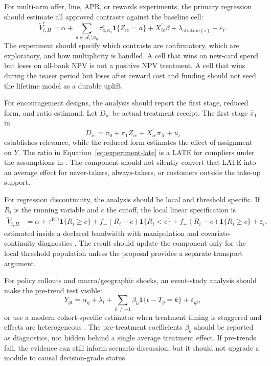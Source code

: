 \documentclass[11pt]{article}
\newcommand{\1}{\mathbf{1}}
\begin{document}
For multi-arm offer, line, APR, or rewards experiments, the primary regression
should estimate all approved contrasts against the baseline cell:
\begin{equation}
  \widetilde{V}^{e}_{i,H}
  =
  \alpha
  +\sum_{a\in\mathcal{A}_e\setminus a_0}
    \tau^{e}_{a,a_0}\1\{Z_{ie}=a\}
  +X_{ie}^{\prime}\beta
  +\lambda_{\mathrm{stratum}(i)}
  +\varepsilon_i.
  \label{eq:multiarm-offer-estimator}
\end{equation}
The experiment should specify which contrasts are confirmatory, which are
exploratory, and how multiplicity is handled. A cell that wins on new-card
spend but loses on all-bank NPV is not a positive NPV treatment. A cell that
wins during the teaser period but loses after reward cost and funding should
not seed the lifetime model as a durable uplift.

For encouragement designs, the analysis should report the first stage,
reduced form, and ratio estimand. Let $D_{ie}$ be actual treatment receipt.
The first stage $\widehat{\pi}_1$ in
\[
  D_{ie}=\pi_0+\pi_1 Z_{ie}+X_{ie}^{\prime}\pi_X+u_i
\]
establishes relevance, while the reduced form estimates the effect of
assignment on $Y$. The ratio in Equation~\eqref{eq:experiment-late} is a LATE
for compliers under the assumptions in \citet{angristimbensrubin1996iv}. The
component should not silently convert that LATE into an average effect for
never-takers, always-takers, or customers outside the take-up support.

For regression discontinuity, the analysis should be local and threshold
specific. If $R_i$ is the running variable and $c$ the cutoff, the local
linear specification is
\begin{align}
  \widetilde{V}_{i,H}
  &=
  \alpha
  +\tau^{\mathrm{RD}}\1\{R_i\ge c\}
  +f_-(R_i-c)\1\{R_i<c\}
  +f_+(R_i-c)\1\{R_i\ge c\}
  +\varepsilon_i,
  \label{eq:rd-local-spec}
\end{align}
estimated inside a declared bandwidth with manipulation and covariate-continuity
diagnostics \citep{lee2010rd}. The result should update the component only for
the local threshold population unless the proposal provides a separate
transport argument.

For policy rollouts and macro/geographic shocks, an event-study analysis should
make the pre-trend test visible:
\begin{equation}
  Y_{gt}
  =
  \alpha_g+\lambda_t
  +\sum_{k\ne -1}\beta_k\1\{t-T_g=k\}
  +\varepsilon_{gt},
  \label{eq:event-study-spec}
\end{equation}
or use a modern cohort-specific estimator when treatment timing is staggered
and effects are heterogeneous
\citep{callaway2021did,sun2021eventstudy}. The pre-treatment coefficients
$\beta_k$ should be reported as diagnostics, not hidden behind a single
average treatment effect. If pre-trends fail, the evidence can still inform
scenario discussion, but it should not upgrade a module to causal
decision-grade status.
\end{document}
